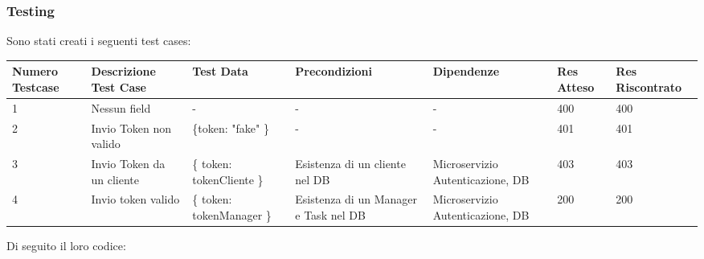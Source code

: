 \documentclass{report}
\begin{document}
\subsubsection*{Testing}

Sono stati creati i seguenti test cases:
\begin{center} %
	\centering
	\begin{tabular}{ |p{1cm}|p{2cm}|p{2cm}|p{2cm}|p{2cm}|p{1cm}|p{1cm}| }
		\hline
		Numero Testcase & Descrizione Test Case & Test Data & Precondizioni & Dipendenze & Res Atteso & Res Riscontrato \\
		\hline
		1 & Nessun field & - & - & - & 400 & 400 \\
		\hline
		2 & Invio Token non valido & \{token: "fake" \} & - & - & 401 & 401 \\
		\hline
		3 & Invio Token da un cliente & \{ token: tokenCliente \} & Esistenza di un cliente nel DB & Microservizio Autenticazione, DB & 403 & 403 \\
		\hline
		4 & Invio token valido & \{ token: tokenManager \} & Esistenza di un Manager e Task nel DB & Microservizio Autenticazione, DB & 200 & 200 \\
		\hline
	\end{tabular}
\end{center}

Di seguito il loro codice:
\end{document}

